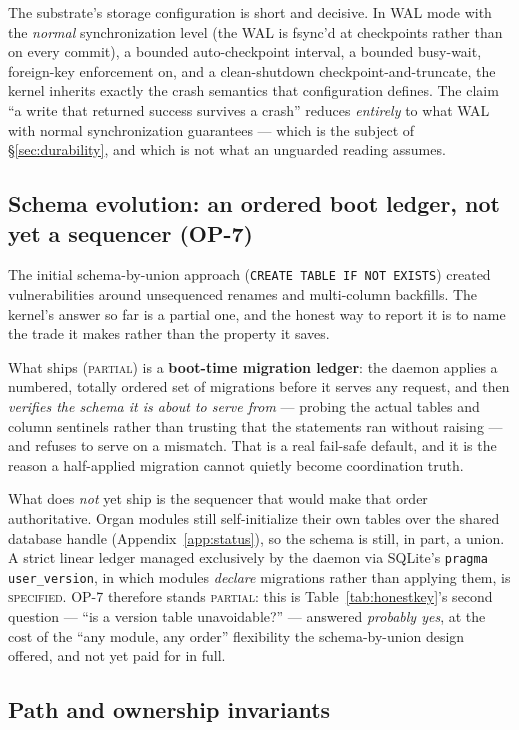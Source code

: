 \documentclass[11pt,a4paper]{article}
\newcommand{\BuiltWeak}{{\textcolor{hhink}{\textsc{partial}}}}
\newcommand{\Designed}{{\textcolor{hhgray}{\textsc{specified}}}}
\newcommand{\Partial}{{\textcolor{hhink}{\textsc{partial}}}}
\theoremstyle{definition}
\theoremstyle{remark}
\begin{document}
The substrate's storage configuration is short and decisive. In WAL mode with
the \emph{normal} synchronization level (the WAL is fsync'd at checkpoints rather
than on every commit), a bounded auto-checkpoint interval, a bounded busy-wait,
foreign-key enforcement on, and a clean-shutdown checkpoint-and-truncate, the
kernel inherits exactly the crash semantics that configuration defines. The claim
``a write that returned success survives a crash'' reduces \emph{entirely} to what
WAL with normal synchronization guarantees --- which is the subject of
\S\ref{sec:durability}, and which is not what an unguarded reading assumes.

\subsection{Schema evolution: an ordered boot ledger, not yet a sequencer (OP-7)}

The initial schema-by-union approach (\texttt{CREATE TABLE IF NOT EXISTS}) created
vulnerabilities around unsequenced renames and multi-column backfills. The kernel's
answer so far is a partial one, and the honest way to report it is to name the trade
it makes rather than the property it saves.

What ships (\BuiltWeak) is a \textbf{boot-time migration ledger}: the daemon applies
a numbered, totally ordered set of migrations before it serves any request, and then
\emph{verifies the schema it is about to serve from} --- probing the actual tables
and column sentinels rather than trusting that the statements ran without raising
--- and refuses to serve on a mismatch. That is a real fail-safe default, and it is
the reason a half-applied migration cannot quietly become coordination truth.

What does \emph{not} yet ship is the sequencer that would make that order
authoritative. Organ modules still self-initialize their own tables over the shared
database handle (Appendix~\ref{app:status}), so the schema is still, in part, a
union. A strict linear ledger managed exclusively by the daemon via SQLite's
\texttt{pragma user\_version}, in which modules \emph{declare} migrations rather
than applying them, is \Designed. OP-7 therefore stands \Partial{}: this is
Table~\ref{tab:honestkey}'s second question --- ``is a version table unavoidable?''
--- answered \emph{probably yes}, at the cost of the ``any module, any order''
flexibility the schema-by-union design offered, and not yet paid for in full.

\subsection{Path and ownership invariants}
\end{document}
